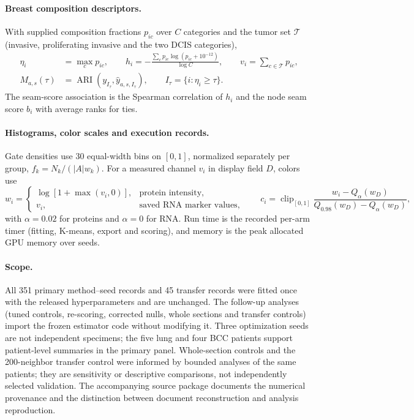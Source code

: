 \documentclass[11pt]{article}
\begin{document}
\paragraph{Breast composition descriptors.} With supplied composition fractions \(p_{ic}\) over \(C\) categories and the tumor set \(\mathcal T\) (invasive, proliferating invasive and the two DCIS categories),
\begin{equation}\begin{aligned}
\eta_i&=\max_c p_{ic},\qquad
h_i=-\frac{\sum_c p_{ic}\log(p_{ic}+10^{-12})}{\log C},\qquad
v_i=\sum_{c\in\mathcal T}p_{ic},\\
M_{a,s}(\tau)&=\operatorname{ARI}(y_{I_\tau},\widehat y_{a,s,I_\tau}),\qquad I_\tau=\{i:\eta_i\geq\tau\}.
\end{aligned}\label{eq:composition}\end{equation}
The seam-score association is the Spearman correlation of \(h_i\) and the node seam score \(b_i\) with average ranks for ties.

\paragraph{Histograms, color scales and execution records.} Gate densities use 30 equal-width bins on \([0,1]\), normalized separately per group, \(f_k=N_k/(|A|w_k)\). For a measured channel \(v_i\) in display field \(D\), colors use
\begin{equation}
w_i=\begin{cases}\log[1+\max(v_i,0)],&\text{protein intensity},\\
v_i,&\text{saved RNA marker values},\end{cases}\qquad
c_i=\operatorname{clip}_{[0,1]}\frac{w_i-Q_\alpha(w_D)}{Q_{0.98}(w_D)-Q_\alpha(w_D)},\label{eq:display-normalization}
\end{equation}
with \(\alpha=0.02\) for proteins and \(\alpha=0\) for RNA. Run time is the recorded per-arm timer (fitting, K-means, export and scoring), and memory is the peak allocated GPU memory over seeds.

\paragraph{Scope.} All 351 primary method--seed records and 45 transfer records were fitted once with the released hyperparameters and are unchanged. The follow-up analyses (tuned controls, re-scoring, corrected nulls, whole sections and transfer controls) import the frozen estimator code without modifying it. Three optimization seeds are not independent specimens; the five lung and four BCC patients support patient-level summaries in the primary panel.
Whole-section controls and the 200-neighbor transfer control were informed by bounded analyses of the same patients; they are sensitivity or descriptive comparisons, not independently selected validation. The accompanying source package documents the numerical provenance and the distinction between document reconstruction and analysis reproduction.
\end{document}
